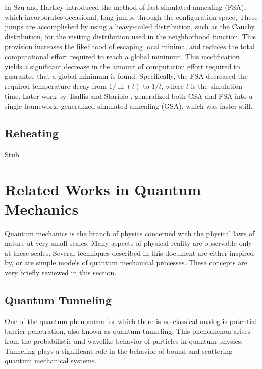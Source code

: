 \documentclass[11pt]{afthesis}
\begin{document}
	In \cite{szu1987fastsimulatedannealing} Szu and Hartley introduced the method of fast simulated annealing (FSA), which incorporates occasional, long jumps through the configuration space, These jumps are accomplished by using a heavy-tailed distribution, such as the Cauchy distribution, for the visiting distribution used in the neighborhood function. This provision increases the likelihood of escaping local minima, and reduces the total computational effort required to reach a global minimum. This modification yields a significant decrease in the amount of computation effort required to guarantee that a global minimum is found. Specifically, the FSA decreased the required temperature decay from $1/\ln(t)$ to $1/t$, where $t$ is the simulation time. Later work by Tsallis and Stariolo \cite{tsallis1996generalizedsimulatedannealing}, generalized both CSA and FSA into a single framework: generalized simulated annealing (GSA), which was faster still.
	
	\subsection{Reheating}
	Stub.
	
	
	\section{Related Works in Quantum Mechanics}
	
	
	Quantum mechanics is the branch of physics concerned with the physical laws of nature at very small scales. Many aspects of physical reality are observable only at these scales. Several techniques described in this document are either inspired by, or are simple models of quantum mechanical processes. These concepts are very briefly reviewed in this section. 
	
	\subsection{Quantum Tunneling} 
	
	
	One of the quantum phenomena for which there is no classical analog is potential barrier penetration, also known as quantum tunneling. This phenomenon arises from the probabilistic and wavelike behavior of particles in quantum physics. Tunneling plays a significant role in the behavior of bound and scattering quantum mechanical systems.
	
\end{document}
